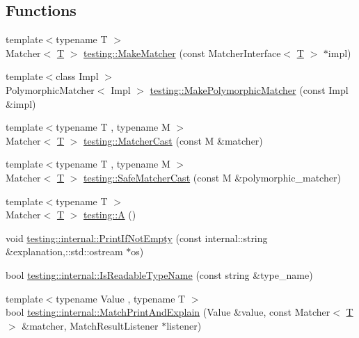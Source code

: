 \subsection*{Functions}
\begin{DoxyCompactItemize}
\item 
{\footnotesize template$<$typename T $>$ }\\Matcher$<$ \hyperlink{functions__7_8js_adf1f3edb9115acb0a1e04209b7a9937b}{T} $>$ \hyperlink{namespacetesting_a37fd8029ac00e60952440a3d9cca8166}{testing\+::\+Make\+Matcher} (const Matcher\+Interface$<$ \hyperlink{functions__7_8js_adf1f3edb9115acb0a1e04209b7a9937b}{T} $>$ $\ast$impl)
\item 
{\footnotesize template$<$class Impl $>$ }\\Polymorphic\+Matcher$<$ Impl $>$ \hyperlink{namespacetesting_a667ca94f190ec2e17ee2fbfdb7d3da04}{testing\+::\+Make\+Polymorphic\+Matcher} (const Impl \&impl)
\item 
{\footnotesize template$<$typename T , typename M $>$ }\\Matcher$<$ \hyperlink{functions__7_8js_adf1f3edb9115acb0a1e04209b7a9937b}{T} $>$ \hyperlink{namespacetesting_a8234d15eee99b135a7fdf2141a2ebe1f}{testing\+::\+Matcher\+Cast} (const M \&matcher)
\item 
{\footnotesize template$<$typename T , typename M $>$ }\\Matcher$<$ \hyperlink{functions__7_8js_adf1f3edb9115acb0a1e04209b7a9937b}{T} $>$ \hyperlink{namespacetesting_ac016ac22aa065a19b9ef95f0ccffc17b}{testing\+::\+Safe\+Matcher\+Cast} (const M \&polymorphic\+\_\+matcher)
\item 
{\footnotesize template$<$typename T $>$ }\\Matcher$<$ \hyperlink{functions__7_8js_adf1f3edb9115acb0a1e04209b7a9937b}{T} $>$ \hyperlink{namespacetesting_a5e9134d655d2fc9323902348083282e7}{testing\+::A} ()
\item 
void \hyperlink{namespacetesting_1_1internal_a77c9e2b66d2b2414db4763971180d53c}{testing\+::internal\+::\+Print\+If\+Not\+Empty} (const internal\+::string \&explanation,\+::std\+::ostream $\ast$os)
\item 
bool \hyperlink{namespacetesting_1_1internal_a19a5d50382569ce6ee94e2b68ddc6fc7}{testing\+::internal\+::\+Is\+Readable\+Type\+Name} (const string \&type\+\_\+name)
\item 
{\footnotesize template$<$typename Value , typename T $>$ }\\bool \hyperlink{namespacetesting_1_1internal_a0821df2611d54c79bac990719ad8a2dd}{testing\+::internal\+::\+Match\+Print\+And\+Explain} (Value \&value, const Matcher$<$ \hyperlink{functions__7_8js_adf1f3edb9115acb0a1e04209b7a9937b}{T} $>$ \&matcher, Match\+Result\+Listener $\ast$listener)

\end{DoxyCompactItemize}

